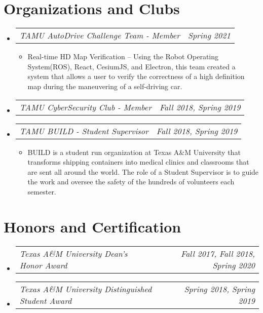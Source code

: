 \documentclass[letterpaper,11pt]{article}
\makeatletter
\newcommand{\resumeAward}[2]{
  \vspace{-1pt}
    \item\begin{tabular*}{0.97\textwidth}{l@{\extracolsep{\fill}}r}
    \textit{\small#1} & \textit{\small #2} \\
    \end{tabular*}\vspace{-20pt}
}
\newcommand{\resumeJobDesc}[1]{
  \item\small{{ #1 \vspace{-2pt}}
  }
}
\newcommand{\resumeSubHeadingListStart}{\begin{itemize}[leftmargin=*]}
\newcommand{\resumeSubHeadingListEnd}{\end{itemize}}
\newcommand{\resumeItemListStart}{\begin{itemize}}
\newcommand{\resumeItemListEnd}{\end{itemize}\vspace{-5pt}}
\makeatother
\begin{document}
\section{Organizations and Clubs}
\resumeSubHeadingListStart
        \resumeAward{TAMU AutoDrive Challenge Team - Member}{Spring 2021}
         \vspace{0pt}
        \resumeItemListStart
                \resumeJobDesc{Real-time HD Map Verification -- Using the Robot Operating System(ROS), React, CesiumJS, and Electron, this team created a system that allows a user to verify the correctness of a high definition map during the maneuvering of a self-driving car. }
        \resumeItemListEnd
        \resumeAward{TAMU CyberSecurity Club - Member}{Fall 2018, Spring 2019}
        \resumeAward{TAMU BUILD - Student Supervisor}{Fall 2018, Spring 2019}
        \vspace{0pt} %
        \resumeItemListStart
                \resumeJobDesc{BUILD is a student run organization at Texas A\&M University that transforms shipping containers into medical clinics and classrooms that are sent all around the world. The role of a Student Supervisor is to guide the work and oversee the safety of the hundreds of volunteers each semester.}
        \resumeItemListEnd
\resumeSubHeadingListEnd

\section{Honors and Certification}
  \resumeSubHeadingListStart
    \resumeAward{Texas A\&M University Dean's Honor Award}{Fall 2017, Fall 2018, Spring 2020}
    \resumeAward{Texas A\&M University Distinguished Student Award}{Spring 2018, Spring 2019}
\resumeSubHeadingListEnd
\end{document}
